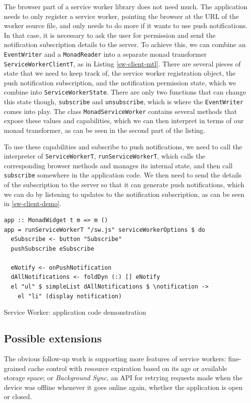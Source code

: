 \documentclass[english,zadani,odsaz]{fitthesis}
\begin{document}
The browser part of a service worker library does not need much. The application
needs to only register a service worker, pointing the browser at the URL of the
worker source file, and only needs to do more if it wants to use push
notifications. In that case, it is necessary to ask the user for permission and
send the notification subscription details to the server. To achieve this, we
can combine an \texttt{EventWriter} and a \texttt{MonadReader} into a separate monad transformer
\texttt{ServiceWorkerClientT}, as in Listing \ref{sw-client-mtl}. There are several pieces
of state that we need to keep track of, the service worker registration object,
the push notification subscription, and the notification permission state, which
we combine into \texttt{ServiceWorkerState}. There are only two functions that can change
this state though, \texttt{subscribe} and \texttt{unsubscribe}, which is where the \texttt{EventWriter}
comes into play. The class \texttt{MonadServiceWorker} contains several methods that
expose these values and capabilities, which we can then interpret in terms of our
monad transformer, as can be seen in the second part of the listing.

To use these capabilities and subscribe to push notifications, we need to call
the interpreter of \texttt{ServiceWorkerT}, \texttt{runServiceWorkerT}, which calls the
corresponding browser methods and manages its internal state, and then call
\texttt{subscribe} somewhere in the application code. We then need to send the details of
the subscription to the server so that it can generate push notifications, which
we can do by listening to updates to the notification subscription, as can be
seen in \ref{sw-client-demo}.

\begin{listing}[t]
\begin{verbatim}
app :: MonadWidget t m => m ()
app = runServiceWorkerT "/sw.js" serviceWorkerOptions $ do
  eSubscribe <- button "Subscribe"
  pushSubscribe eSubscribe

  eNotify <- onPushNotification
  dAllNotifications <- foldDyn (:) [] eNotify
  el "ul" $ simpleList dAllNotifications $ \notification ->
    el "li" (display notification)
\end{verbatim}
\caption{Service Worker: application code demonstration \label{sw-client-demo}}
\end{listing}

\subsection{Possible extensions}
\label{sec:org9909b7b}
The obvious follow-up work is supporting more features of service workers:
fine-grained cache control with resource expiration based on its age or
available storage space; or \emph{Background Sync}, an API for retrying requests made
when the device was offline whenever it goes online again, whether the
application is open or closed.
\end{document}
